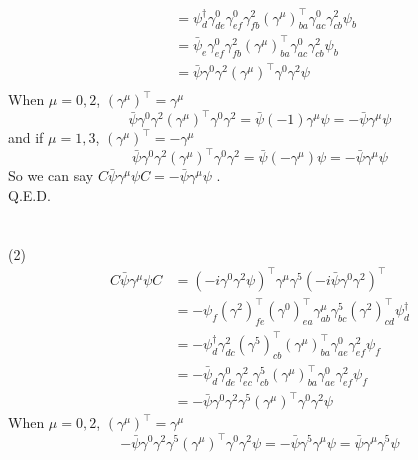 \documentclass[12pt]{article}
\begin{document}
\begin{spacing}{1.5}
\begin{align*}
	&= \psi^{\dagger}_{d} \gamma^{0}_{de}\gamma^{0}_{ef} \gamma^{2}_{fb} (\gamma^{\mu})^{\top}_{ba} \gamma^{0}_{ac}\gamma^{2}_{cb} \psi_{b} \\
	&= \bar\psi_{e} \gamma^{0}_{ef} \gamma^{2}_{fb} (\gamma^{\mu})^{\top}_{ba} \gamma^{0}_{ac}\gamma^{2}_{cb} \psi_{b} \\
	&= \bar\psi \gamma^{0}\gamma^{2} (\gamma^{\mu})^{\top} \gamma^{0}\gamma^{2} \psi\\
	\tag{3.1.1}
\end{align*}
When $\mu=0, 2$, $(\gamma^{\mu})^{\top} = \gamma^{\mu}$
\begin{equation}
\bar\psi \gamma^{0}\gamma^{2} (\gamma^{\mu})^{\top} \gamma^{0}\gamma^{2} = \bar\psi (-1)\gamma^{\mu} \psi = -\bar\psi \gamma^{\mu} \psi
	\tag{3.1.2}
\end{equation}
and if $\mu=1, 3$, $(\gamma^{\mu})^{\top} = -\gamma^{\mu}$
\begin{equation}
\bar\psi \gamma^{0}\gamma^{2} (\gamma^{\mu})^{\top} \gamma^{0}\gamma^{2} = \bar\psi (-\gamma^{\mu}) \psi = -\bar\psi \gamma^{\mu} \psi
	\tag{3.1.3}
\end{equation}
So we can say $\displaystyle C\bar\psi\gamma^{\mu}\psi C = -\bar\psi \gamma^{\mu} \psi$ . \\
Q.E.D.\\
~\\
~\\
(2) 
\begin{equation}
\begin{aligned}
	C\bar\psi\gamma^{\mu}\psi C &= (-i\gamma^{0}\gamma^{2}\psi)^{\top}\gamma^{\mu}\gamma^{5}(-i\bar\psi\gamma^{0}\gamma^{2})^{\top}\\
	&= -\psi_{f} (\gamma^{2})^{\top}_{fe}(\gamma^{0})^{\top}_{ea} \gamma^{\mu}_{ab}\gamma^{5}_{bc} (\gamma^{2})^{\top}_{cd} \psi^{\dagger}_{d} \\
	&= -\psi^{\dagger}_{d} \gamma^{2}_{dc} (\gamma^{5})^{\top}_{cb}(\gamma^{\mu})^{\top}_{ba} \gamma^{0}_{ae}\gamma^{2}_{ef} \psi_{f} \\
	&= -\bar\psi_{d}  \gamma^{0}_{de}\gamma^{2}_{ec} \gamma^{5}_{cb}(\gamma^{\mu})^{\top}_{ba} \gamma^{0}_{ae}\gamma^{2}_{ef} \psi_{f} \\
	&= -\bar\psi \gamma^{0}\gamma^{2} \gamma^{5}(\gamma^{\mu})^{\top} \gamma^{0}\gamma^{2} \psi
\end{aligned}
	\tag{3.2.1}
\end{equation}
When $\mu=0, 2$, $(\gamma^{\mu})^{\top} = \gamma^{\mu}$
\begin{equation}
-\bar\psi \gamma^{0}\gamma^{2} \gamma^{5}(\gamma^{\mu})^{\top} \gamma^{0}\gamma^{2} \psi = -\bar\psi \gamma^{5}\gamma^{\mu} \psi = \bar\psi \gamma^{\mu}\gamma^{5} \psi

\end{equation}
\end{spacing}
\end{document}
